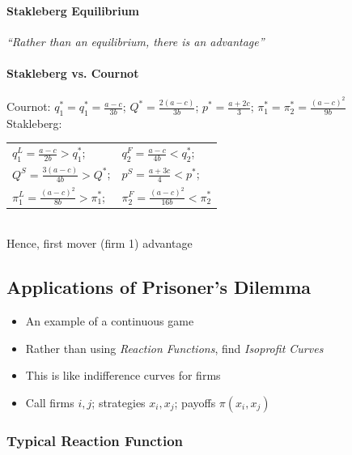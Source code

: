 \documentclass[11pt, english]{article}
\begin{document}
		\paragraph{Stakleberg Equilibrium}

	\textit{``Rather than an equilibrium, there is an advantage''}\\


		\paragraph{Stakleberg vs. Cournot}

	Cournot: $q_1^\ast=q_1^\ast=\frac{a-c}{3b}$; $Q^\ast=\frac{2(a-c)}{3b}$; $p^\ast=\frac{a+2c}{3}$; $\pi_1^\ast=\pi_2^\ast=\frac{{(a-c)}^2}{9b}$\\
	
	Stakleberg:
	\begin{tabular}{ll}
		$q_1^L=\frac{a-c}{2b}>q_1^\ast$; & $q_2^F=\frac{a-c}{4b}<q_2^\ast$;\\
		$Q^S=\frac{3(a-c)}{4b}>Q^\ast$; & $p^S=\frac{a+3c}{4}<p^\ast$;\\
		$\pi_1^L=\frac{(a-c)^2}{8b}>\pi_1^\ast$; & $\pi_2^F=\frac{(a-c)^2}{16b}<\pi_2^\ast$
	\end{tabular}\\
	
	Hence, first mover (firm 1) advantage
	
	\newpage

	\subsection{Applications of Prisoner's Dilemma}

	\begin{itemize}
	\setlength\itemsep{0cm}
		\item An example of a continuous game
		\item Rather than using \textit{Reaction Functions}, find \textit{Isoprofit Curves}
		\item This is like indifference curves for firms
		\item Call firms $i,j$; strategies $x_i,x_j$; payoffs $\pi(x_i,x_j)$
	\end{itemize}

		\subsubsection{Typical Reaction Function}
\end{document}

